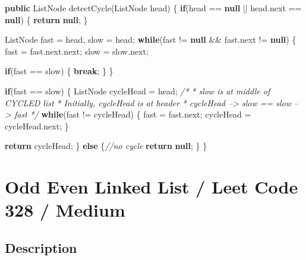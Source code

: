 \documentclass[]{book}
\newenvironment{Shaded}{\begin{snugshade}}{\end{snugshade}}
\newcommand{\CommentTok}[1]{\textcolor[rgb]{0.56,0.35,0.01}{\textit{#1}}}
\newcommand{\FunctionTok}[1]{\textcolor[rgb]{0.00,0.00,0.00}{#1}}
\newcommand{\KeywordTok}[1]{\textcolor[rgb]{0.13,0.29,0.53}{\textbf{#1}}}
\newcommand{\NormalTok}[1]{#1}
\begin{document}
\begin{Shaded}
\begin{Highlighting}[]
\KeywordTok{public}\NormalTok{ ListNode }\FunctionTok{detectCycle}\NormalTok{(ListNode head) \{}
    \KeywordTok{if}\NormalTok{(head == }\KeywordTok{null}\NormalTok{ || head.}\FunctionTok{next}\NormalTok{ == }\KeywordTok{null}\NormalTok{) \{}
        \KeywordTok{return} \KeywordTok{null}\NormalTok{;}
\NormalTok{    \}}

\NormalTok{    ListNode fast = head, slow = head;}
    \KeywordTok{while}\NormalTok{(fast != }\KeywordTok{null}\NormalTok{ && fast.}\FunctionTok{next}\NormalTok{ != }\KeywordTok{null}\NormalTok{) \{}
\NormalTok{        fast = fast.}\FunctionTok{next}\NormalTok{.}\FunctionTok{next}\NormalTok{;}
\NormalTok{        slow = slow.}\FunctionTok{next}\NormalTok{;}

        \KeywordTok{if}\NormalTok{(fast == slow) \{}
            \KeywordTok{break}\NormalTok{;}
\NormalTok{        \}}
\NormalTok{    \}}

    \KeywordTok{if}\NormalTok{(fast == slow) \{}
\NormalTok{        ListNode cycleHead = head;}
        \CommentTok{/*}
\CommentTok{         * slow is at middle of CYCLED list}
\CommentTok{         * Initially, cycleHead is at header}
\CommentTok{         * cycleHead --> slow == slow --> fast}
\CommentTok{         */}
        \KeywordTok{while}\NormalTok{(fast != cycleHead) \{}
\NormalTok{            fast = fast.}\FunctionTok{next}\NormalTok{;}
\NormalTok{            cycleHead = cycleHead.}\FunctionTok{next}\NormalTok{;}
\NormalTok{        \}}

        \KeywordTok{return}\NormalTok{ cycleHead;}
\NormalTok{    \} }\KeywordTok{else}\NormalTok{ \{}\CommentTok{//no cycle}
        \KeywordTok{return} \KeywordTok{null}\NormalTok{;}
\NormalTok{    \}}
\NormalTok{\}}
\end{Highlighting}
\end{Shaded}

\hypertarget{odd-even-linked-list-leet-code-328-medium}{%
\section{Odd Even Linked List / Leet Code 328 / Medium}\label{odd-even-linked-list-leet-code-328-medium}}

\hypertarget{description-92}{%
\subsection{Description}\label{description-92}}
\end{document}
